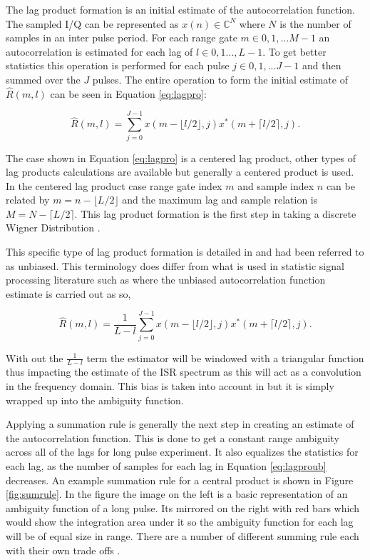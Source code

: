 \documentclass[draft,ras]{agutex}
\begin{document}
\begin{article}
The lag product formation is an initial estimate of the autocorrelation function. The sampled I/Q can be represented as $x(n) \in\mathbb{C}^N$ where $N$ is the number of samples in an inter pulse period. For each range gate $m\in 0,1,...M-1$ an autocorrelation is estimated for each lag of $l \in 0,1...,L-1$.  To get better statistics this operation is performed for each pulse $j\in 0,1,...J-1$ and then summed over the $J$ pulses. The entire operation to form the initial estimate of $\hat{R}(m,l)$ can be seen in Equation \ref{eq:lagpro}:

\begin{equation}
\label{eq:lagpro}
\hat{R}(m,l) = \displaystyle\sum\limits_{j=0}^{J-1} x(m-\lfloor l/2\rfloor,j)x^*(m+\lceil l/2 \rceil,j).
\end{equation}

The case shown in Equation \ref{eq:lagpro} is a centered lag product, other types of lag products calculations are available but generally a centered product is used. In the centered lag product case range gate index $m$ and sample index $n$ can be related by $m=n-\lfloor L/2\rfloor$ and the maximum lag and sample relation is $M=N-\lceil L/2 \rceil$.  This lag product formation is the first step in taking a discrete Wigner Distribution \citep{TFAcohen}.

This specific type of lag product formation is detailed in \citep{farley1969} and had been referred to as unbiased. This terminology does differ from what is used in statistic signal processing literature such as \citep{randomsigshanmugan} where the unbiased autocorrelation function estimate is carried out as so,

\begin{equation}
\label{eq:lagproub}
\hat{R}(m,l) = \frac{1}{L-l}\displaystyle\sum\limits_{j=0}^{J-1} x(m-\lfloor l/2\rfloor,j)x^*(m+\lceil l/2 \rceil,j).
\end{equation}

\noindent With out the $\frac{1}{L-l}$ term the estimator will be windowed with a triangular function thus impacting the estimate of the ISR spectrum as this will act as a convolution in the frequency domain. This bias is taken into account in \citep{farley1969} but it is simply wrapped up into the ambiguity function. 

Applying a summation rule is generally the next step in creating an estimate of the autocorrelation function.  This is done to get a constant range ambiguity across all of the lags for long pulse experiment\citep{nygren1996}. It also equalizes the statistics for each lag, as the number of samples for each lag in Equation \ref{eq:lagproub} decreases.  An example summation rule for a central product is shown in Figure \ref{fig:sumrule}. In the figure the image on the left is a basic representation of an ambiguity function of a long pulse.  Its mirrored on the right with red bars which would show the integration area under it so the ambiguity function for each lag will be of equal size in range. There are a number of different summing rule each with their own trade offs \citep{nygren1996}.


\end{article}
\end{document}
